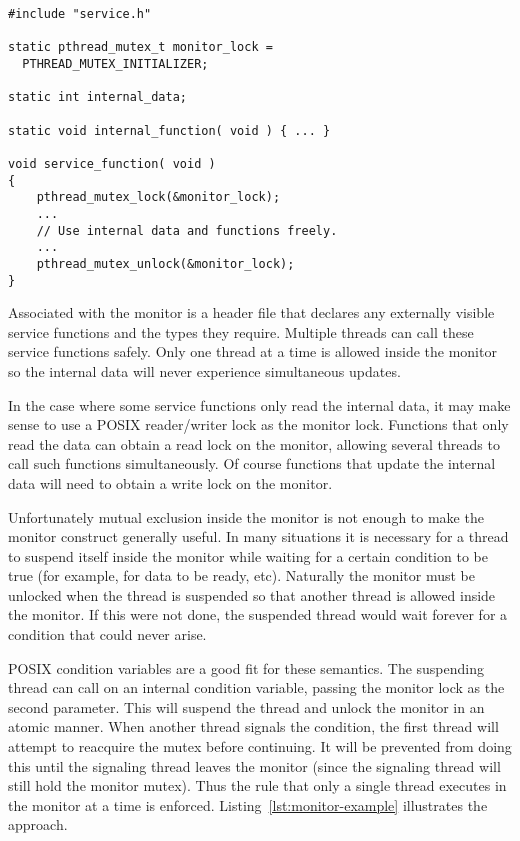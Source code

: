 \begin{lstlisting}[float=tp,frame=single,xleftmargin=0in,
  caption={Basic Monitor},label=lst:basic-monitor]
#include "service.h"

static pthread_mutex_t monitor_lock =
  PTHREAD_MUTEX_INITIALIZER;

static int internal_data;

static void internal_function( void ) { ... }

void service_function( void )
{
    pthread_mutex_lock(&monitor_lock);
    ...
    // Use internal data and functions freely.
    ...
    pthread_mutex_unlock(&monitor_lock);
}
\end{lstlisting}

Associated with the monitor is a header file that declares any externally visible service
functions and the types they require. Multiple threads can call these service functions safely.
Only one thread at a time is allowed inside the monitor so the internal data will never
experience simultaneous updates.

In the case where some service functions only read the internal data, it may make sense to use a
POSIX reader/writer lock as the monitor lock. Functions that only read the data can obtain a
read lock on the monitor, allowing several threads to call such functions simultaneously. Of
course functions that update the internal data will need to obtain a write lock on the monitor.

Unfortunately mutual exclusion inside the monitor is not enough to make the monitor construct
generally useful. In many situations it is necessary for a thread to suspend itself inside the
monitor while waiting for a certain condition to be true (for example, for data to be ready,
etc). Naturally the monitor must be unlocked when the thread is suspended so that another thread
is allowed inside the monitor. If this were not done, the suspended thread would wait forever
for a condition that could never arise.

POSIX condition variables are a good fit for these semantics. The suspending thread can call
 on an internal condition variable, passing the monitor lock as the
second parameter. This will suspend the thread and unlock the monitor in an atomic manner. When
another thread signals the condition, the first thread will attempt to reacquire the mutex
before continuing. It will be prevented from doing this until the signaling thread leaves the
monitor (since the signaling thread will still hold the monitor mutex). Thus the rule that only
a single thread executes in the monitor at a time is enforced. Listing~\ref{lst:monitor-example}
illustrates the approach.

